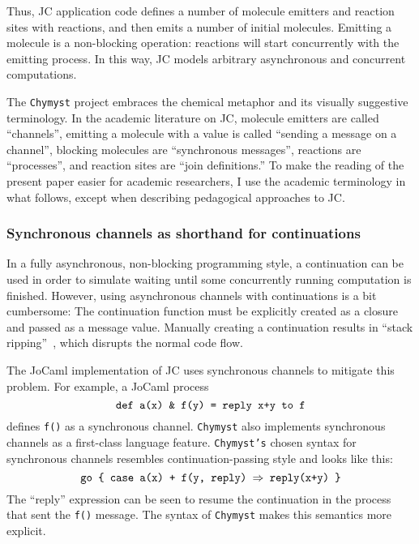 \documentclass[sigplan,10pt]{acmart}\settopmatter{}
\begin{document}
Thus, JC application code defines a number of molecule emitters and
reaction sites with reactions, and then emits a number of initial
molecules. Emitting a molecule is a non-blocking operation: reactions
will start concurrently with the emitting process. In this way, JC
models arbitrary asynchronous and concurrent computations.

The \texttt{Chymyst} project embraces the chemical metaphor and its
visually suggestive terminology. In the academic literature on JC,
molecule emitters are called ``channels'', emitting a molecule with
a value is called ``sending a message on a channel'', blocking molecules
are ``synchronous messages'', reactions are ``processes'', and
reaction sites are ``join definitions.'' To make the reading of
the present paper easier for academic researchers, I use the academic
terminology in what follows, except when describing pedagogical approaches
to JC. 

\subsubsection{Synchronous channels as shorthand for continuations}

In a fully asynchronous, non-blocking programming style, a continuation
can be used in order to simulate waiting until some concurrently running computation
is finished. However, using asynchronous channels with continuations
is a bit cumbersome: The continuation function must be explicitly
created as a closure and passed as a message value. Manually creating
a continuation results in ``stack ripping''~\citep{Ady2002}, which
disrupts the normal code flow. 

The JoCaml implementation of JC uses synchronous channels to mitigate
this problem. For example, a JoCaml process 
\[
\text{\texttt{def a(x) \& f(y) = reply x+y to f}}
\]
defines \texttt{f()} as a synchronous channel. \texttt{Chymyst} also
implements synchronous channels as a first-class language feature.
\texttt{Chymyst's} chosen syntax for synchronous channels resembles
continuation-passing style and looks like this:
\[
\text{\texttt{go \{ case a(x) + f(y, reply) \ensuremath{\Rightarrow} reply(x+y) \}}}
\]
The ``reply'' expression can be seen to resume the continuation
in the process that sent the \texttt{f()} message. The syntax of \texttt{Chymyst}
makes this semantics more explicit.
\end{document}
